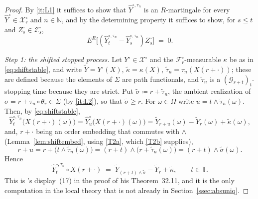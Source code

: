 \documentclass[11pt,a4paper]{article}
\theoremstyle{plain}
\theoremstyle{definition}
\theoremstyle{remark}
\newcommand{\N}{\mathbb{N}}
\newcommand{\T}{\mathbb{T}}                     %
\newcommand{\Filt}{\mathcal{F}}
\newcommand{\Gilt}{\mathcal{G}}
\newcommand{\XX}{\mathcal{X}}                  %
\newcommand{\ZZ}{\mathcal{Z}}                  %
\newcommand{\KA}{\cite{Kal21}}
\begin{document}
\begin{proof}
  By \ref{it:L1} it suffices to show that $\hat{Y}^{\circ,\tau_n}$ is an
  $R$-martingale for every $\hat{Y}^\circ \in \XX^\circ_r$ and $n \in \N$, and by
  the determining property it suffices to show, for $s \leq t$ and
  $Z^\circ_s \in \ZZ^\circ_s$,
  \begin{equation}
    \label{eq:localrestart}
    E^R\bigl[ (\hat{Y}^{\circ,\tau_n}_t - \hat{Y}^{\circ,\tau_n}_s) Z^\circ_s \bigr]
      \;=\; 0 .
  \end{equation}

  \emph{Step 1: the shifted stopped process.}
  Let $Y^\circ \in \XX^\circ$ and the $\Filt^\circ_r$-measurable $\kappa$ be as in
  \eqref{eq:shiftstable}, and write $\tilde{Y} = Y^\circ(X)$,
  $\tilde\kappa = \kappa(X)$, $\tilde\tau_n = \tau_n(X(r+\cdot))$; these are
  defined because the elements of $\Sigma$ are path functionals, and
  $\tilde\tau_n$ is a $(\Gilt_{r+t})_t$-stopping time because they are strict.
  Put $\tilde\sigma \coloneqq r + \tilde\tau_n$, the ambient realization of
  $\sigma = r + \tau_n \circ \theta_r \in \Sigma$ (by \ref{it:L2}), so that
  $\tilde\sigma \geq r$.  For $\omega \in \Omega$ write
  $u = t \wedge \tilde\tau_n(\omega)$.  Then, by \eqref{eq:shiftstable},
  \[
    \hat{Y}^{\circ,\tau_n}_t \bigl( X(r+\cdot)(\omega) \bigr)
      = \hat{Y}^\circ_u \bigl( X(r+\cdot)(\omega) \bigr)
      = \tilde{Y}_{r+u}(\omega) - \tilde{Y}_r(\omega) + \tilde\kappa(\omega) ,
  \]
  and, $r + \cdot$ being an order embedding that commutes with $\wedge$
  (Lemma~\ref{lem:shiftembed}, using \eqref{T2a}, which \eqref{T2b} supplies),
  \[
    r + u = r + \bigl( t \wedge \tilde\tau_n(\omega) \bigr)
          = (r+t) \wedge \bigl( r + \tilde\tau_n(\omega) \bigr)
          = (r+t) \wedge \tilde\sigma(\omega) .
  \]
  Hence
  \begin{equation}
    \label{eq:shiftedstopped}
    \hat{Y}^{\circ,\tau_n}_t \circ X(r+\cdot)
      \;=\; \tilde{Y}_{(r+t) \wedge \tilde\sigma} - \tilde{Y}_r + \tilde\kappa ,
    \qquad t \in \T .
  \end{equation}
  This is \KA's display~(17) in the proof of his Theorem~32.11, and it is the
  only computation in the local theory that is not already in
  Section~\ref{ssec:absuniq}.


\end{proof}
\end{document}
